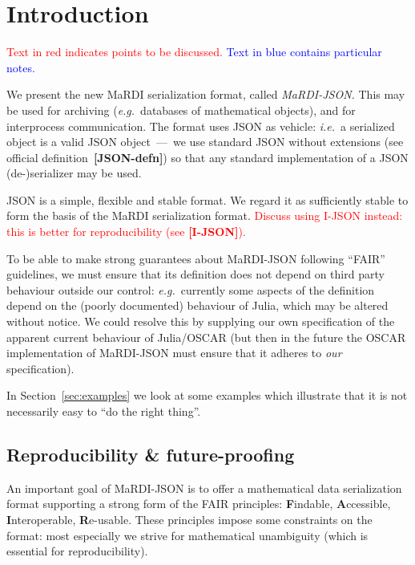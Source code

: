 \documentclass{article}
\newcommand{\MaRDIJSON}{MaRDI-JSON}
\newcommand \ie {\textit{i.e.}}
\newcommand \eg {\textit{e.g.}}
\def\red#1{\textcolor{red}{#1}}
\def\blue#1{\textcolor{blue}{#1}}
\begin{document}



\section{Introduction}

\red{Text in red indicates points to be discussed.}  \blue{Text in blue contains particular notes.}

We present the new MaRDI serialization format, called
\textit{\MaRDIJSON.}  This may be used for archiving (\eg~databases of
mathematical objects), and for interprocess communication.  The format
uses JSON as vehicle: \ie~a serialized object is a valid JSON
object~---~we use standard JSON without extensions (see official
definition~\textbf{[JSON-defn]}) so that any standard implementation
of a JSON (de-)serializer may be used.

JSON is a simple, flexible and stable format.  We regard it as
sufficiently stable to form the basis of the MaRDI serialization
format.
\red{Discuss using I-JSON instead: this is better for
  reproducibility (see \textbf{[I-JSON]}).}

To be able to make strong guarantees about {\MaRDIJSON} following
``FAIR'' guidelines, we must ensure that its definition does not
depend on third party behaviour outside our control: \eg~currently
some aspects of the definition depend on the (poorly documented)
behaviour of Julia, which may be altered without notice.  We could
resolve this by supplying our own specification of the apparent
current behaviour of Julia/OSCAR (but then in the future the OSCAR
implementation of {\MaRDIJSON} must ensure that it adheres to
\textit{our} specification).

In Section~\ref{sec:examples} we look at some examples which
illustrate that it is not necessarily easy to ``do the right thing''.


\subsection{Reproducibility {\&} future-proofing}
\label{sec:Reproducibility}

An important goal of {\MaRDIJSON} is to offer a mathematical data
serialization format supporting a strong form of the FAIR principles:
\textbf{F}indable, \textbf{A}ccessible, \textbf{I}nteroperable,
\textbf{R}e-usable.  These principles impose some constraints on the
format: most especially we strive for mathematical unambiguity (which
is essential for reproducibility).
\end{document}
